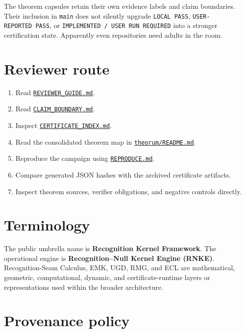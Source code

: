 The theorem capsules retain their own evidence labels and claim boundaries. Their inclusion in \texttt{main} does not silently upgrade \texttt{LOCAL\ PASS}, \texttt{USER-REPORTED\ PASS}, or \texttt{IMPLEMENTED\ /\ USER\ RUN\ REQUIRED} into a stronger certification state. Apparently even repositories need adults in the room.

\hypertarget{reviewer-route}{%
\section{Reviewer route}\label{reviewer-route}}

\begin{enumerate}
\def\labelenumi{\arabic{enumi}.}
\tightlist
\item
  Read \href{REVIEWER_GUIDE.md}{\texttt{REVIEWER\_GUIDE.md}}.
\item
  Read \href{CLAIM_BOUNDARY.md}{\texttt{CLAIM\_BOUNDARY.md}}.
\item
  Inspect \href{CERTIFICATE_INDEX.md}{\texttt{CERTIFICATE\_INDEX.md}}.
\item
  Read the consolidated theorem map in \href{theorum/README.md}{\texttt{theorum/README.md}}.
\item
  Reproduce the campaign using \href{REPRODUCE.md}{\texttt{REPRODUCE.md}}.
\item
  Compare generated JSON hashes with the archived certificate artifacts.
\item
  Inspect theorem sources, verifier obligations, and negative controls directly.
\end{enumerate}

\hypertarget{terminology}{%
\section{Terminology}\label{terminology}}

The public umbrella name is \textbf{Recognition Kernel Framework}. The operational engine is \textbf{Recognition--Null Kernel Engine (RNKE)}. Recognition-Seam Calculus, EMK, UGD, RMG, and ECL are mathematical, geometric, computational, dynamic, and certificate-runtime layers or representations used within the broader architecture.

\hypertarget{provenance-policy}{%
\section{Provenance policy}\label{provenance-policy}}

